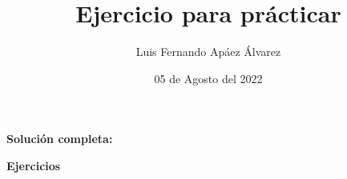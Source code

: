 \documentclass[12pt]{article}
\title{Ejercicio para prácticar}
\author{Luis Fernando Apáez Álvarez}
\date{05 de Agosto del 2022}
\begin{document}
\maketitle
\textbf{\large{Solución completa:}} 
\vspace{1cm}

\textbf{\large{Ejercicios}}

\end{document}
